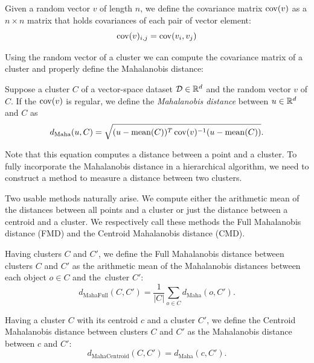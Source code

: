 \begin{defn}
	Given a random vector $v$ of length $n$, we define the covariance matrix $\operatorname{cov}(v)$ as a $n\times n$ matrix that holds covariances of each pair of vector element:
	$$\operatorname{cov}(v)_{i,j}=\operatorname{cov}(v_i,v_j)$$
\end{defn}

Using the random vector of a cluster we can compute the covariance matrix of a cluster and properly define the Mahalanobis distance:

\begin{defn}
	Suppose a cluster $C$ of a vector-space dataset $\mathcal{D}\in\mathbb{R}^d$ and the random vector $v$ of $C$. If the $\operatorname{cov}(v)$ is regular, we define the \emph{Mahalanobis distance} between $u \in \mathbb{R}^d$ and $C$ as
	\begin{equation}
	d_\text{Maha}(u,C) = \sqrt{(u-\operatorname{mean}(C))^T\operatorname{cov}(v)^{-1}(u-\operatorname{mean}(C))}.
	\end{equation}\label{eq01:maha}
\end{defn}

Note that this equation computes a distance between a point and a cluster. To fully incorporate the Mahalanobis distance in a hierarchical algorithm, we need to construct a method to measure a distance between two clusters.

Two usable methods naturally arise. We compute either the arithmetic mean of the distances between all points and a cluster or just the distance between a centroid and a cluster. We respectively call these methods the Full Mahalanobis distance (FMD) and the Centroid Mahalanobis distance (CMD).

\begin{defn}
	Having clusters $C$ and $C'$, we define the Full Mahalanobis distance between clusters $C$ and $C'$ as the arithmetic mean of the Mahalanobis distances between each object $o \in C$ and the~cluster $C'$:
	$$d_\text{MahaFull}(C,C') =\frac{1}{|C|}\sum_{o\in C}{d_\text{Maha}(o,C')}.$$
	\label{def01:fmd}
\end{defn}

\begin{defn}
	Having a cluster $C$ with its centroid $c$ and a cluster $C'$, we define the Centroid Mahalanobis distance between clusters $C$ and $C'$ as the Mahalanobis distance between $c$ and $C'$:
	$$d_\text{MahaCentroid}(C,C')=d_\text{Maha}(c,C').$$
	\label{def01:cmd}
\end{defn}


